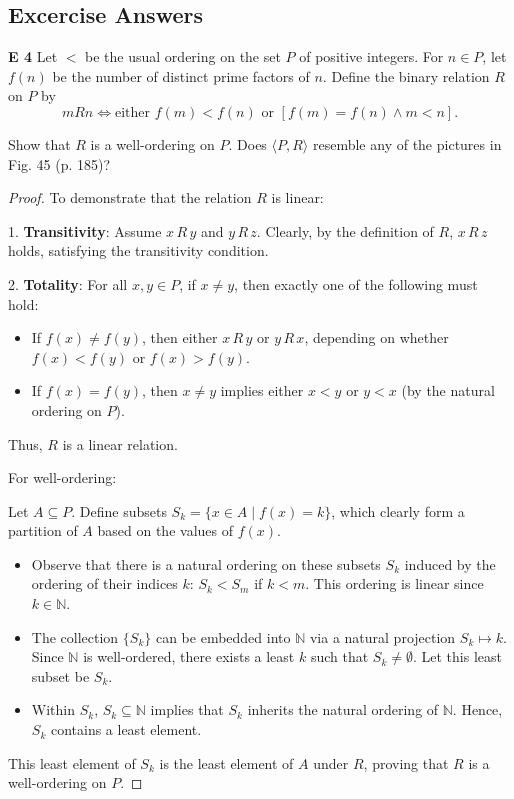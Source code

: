 \subsection{Excercise Answers}
\begin{question}
    \textbf{E 4}
    Let \(<\) be the usual ordering on the set \(P\) of positive integers. For \(n \in P\), let \(f(n)\) be the number of distinct prime factors of \(n\). Define the binary relation \(R\) on \(P\) by
    \[
    mRn \iff \text{either } f(m) < f(n) \text{ or } \left[ f(m) = f(n) \land m < n \right].
    \]

    Show that \(R\) is a well-ordering on \(P\). Does \(\langle P, R \rangle\) resemble any of the pictures in Fig. 45 (p. 185)?
\end{question}
\begin{proof}
    
    To demonstrate that the relation \(R\) is linear:

    1. \textbf{Transitivity}: Assume \(x \, R \, y\) and \(y \, R \, z\). Clearly, by the definition of \(R\), \(x \, R \, z\) holds, satisfying the transitivity condition.

    2. \textbf{Totality}: For all \(x, y \in P\), if \(x \neq y\), then exactly one of the following must hold:
        \begin{itemize}
            \item If \(f(x) \neq f(y)\), then either \(x \, R \, y\) or \(y \, R \, x\), depending on whether \(f(x) < f(y)\) or \(f(x) > f(y)\).
            \item If \(f(x) = f(y)\), then \(x \neq y\) implies either \(x < y\) or \(y < x\) (by the natural ordering on \(P\)).
        \end{itemize}

    Thus, \(R\) is a linear relation.

    For well-ordering:

    Let \(A \subseteq P\). Define subsets \(S_k = \{x \in A \mid f(x) = k\}\), which clearly form a partition of \(A\) based on the values of \(f(x)\).

    \begin{itemize}
        \item Observe that there is a natural ordering on these subsets \(S_k\) induced by the ordering of their indices \(k\): \(S_k < S_m\) if \(k < m\). This ordering is linear since \(k \in \mathbb{N}\).
        \item The collection \(\{S_k\}\) can be embedded into \(\mathbb{N}\) via a natural projection \(S_k \mapsto k\). Since \(\mathbb{N}\) is well-ordered, there exists a least \(k\) such that \(S_k \neq \emptyset\). Let this least subset be \(S_k\).
        \item Within \(S_k\), \(S_k \subseteq \mathbb{N}\) implies that \(S_k\) inherits the natural ordering of \(\mathbb{N}\). Hence, \(S_k\) contains a least element.
    \end{itemize}

    This least element of \(S_k\) is the least element of \(A\) under \(R\), proving that \(R\) is a well-ordering on \(P\).
\end{proof}
